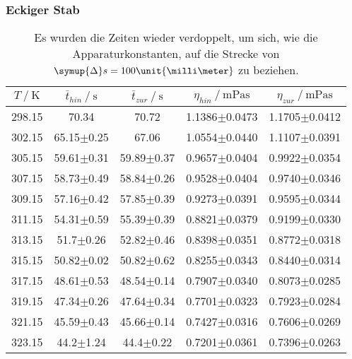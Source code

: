 \subsubsection{Eckiger Stab}
\label{sec:Eckiger Stab}


\begin{table}[H]
  \centering
  \caption{Es wurden die Zeiten wieder verdoppelt, um sich, wie die Apparaturkonstanten, auf die Strecke 
  von $\symup{\Delta}s=100\unit{\milli\meter}$ zu beziehen.}
  \begin{tabular}{ccccc}
    \toprule
    {$T \mathbin{/} \unit{\kelvin}$} &
    {$\bar{t}_{hin} \mathbin{/} \unit{\second}$} &
    {$\bar{t}_{zur} \mathbin{/} \unit{\second}$} &
    {$\eta_{hin} \mathbin{/} \unit{\milli\pascal\second}$} &
    {$\eta_{zur} \mathbin{/} \unit{\milli\pascal\second}$} \\
    \midrule
    298.15 & 70.34          & 70.72          & 1.1386$\pm$0.0473 & 1.1705$\pm$0.0412 \\
    302.15 & 65.15$\pm$0.25 & 67.06          & 1.0554$\pm$0.0440 & 1.1107$\pm$0.0391 \\
    305.15 & 59.61$\pm$0.31 & 59.89$\pm$0.37 & 0.9657$\pm$0.0404 & 0.9922$\pm$0.0354 \\
    307.15 & 58.73$\pm$0.49 & 58.84$\pm$0.26 & 0.9528$\pm$0.0404 & 0.9740$\pm$0.0346 \\
    309.15 & 57.16$\pm$0.42 & 57.85$\pm$0.39 & 0.9273$\pm$0.0391 & 0.9595$\pm$0.0344 \\
    311.15 & 54.31$\pm$0.59 & 55.39$\pm$0.39 & 0.8821$\pm$0.0379 & 0.9199$\pm$0.0330 \\
    313.15 & 51.7$\pm$0.26  & 52.82$\pm$0.46 & 0.8398$\pm$0.0351 & 0.8772$\pm$0.0318 \\
    315.15 & 50.82$\pm$0.02 & 50.82$\pm$0.62 & 0.8255$\pm$0.0343 & 0.8440$\pm$0.0314 \\
    317.15 & 48.61$\pm$0.53 & 48.54$\pm$0.14 & 0.7907$\pm$0.0340 & 0.8073$\pm$0.0285 \\
    319.15 & 47.34$\pm$0.26 & 47.64$\pm$0.34 & 0.7701$\pm$0.0323 & 0.7923$\pm$0.0284 \\
    321.15 & 45.59$\pm$0.43 & 45.66$\pm$0.14 & 0.7427$\pm$0.0316 & 0.7606$\pm$0.0269 \\
    323.15 & 44.2$\pm$1.24  & 44.4$\pm$0.22  & 0.7201$\pm$0.0361 & 0.7396$\pm$0.0263 \\
    \bottomrule
  \end{tabular}
  \label{tab:Tabelle2}
\end{table}

